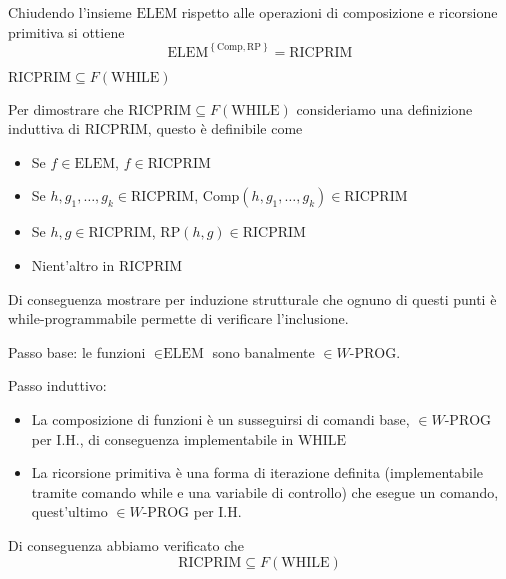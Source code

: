 \documentclass[12pt, answers]{exam}
\theoremstyle{plain}
\newcommand{\while}{\text{WHILE}}
\newcommand{\elem}{\text{ELEM}}
\newcommand{\wprog}{W\text{-PROG}}
\newcommand{\comp}{\text{Comp}}
\newcommand{\rp}{\text{RP}}
\newcommand{\ricprim}{\text{RICPRIM}}
\begin{document}
\begin{questions}
\begin{solution}
            Chiudendo l'insieme $\elem$ rispetto alle operazioni di composizione e ricorsione primitiva si ottiene
            $$ \elem^{\left\{\comp, \rp\right\}} = \ricprim $$
        \end{solution}
        
        \question $\ricprim \subseteq F(\while)$
        
        \begin{solution}
            Per dimostrare che $\ricprim \subseteq F(\while)$ consideriamo una definizione induttiva di $\ricprim$, questo è definibile come
            \begin{itemize}
                \item Se $f \in \elem$, $f \in \ricprim$
                
                \item Se $h,g_1, \dots, g_k \in \ricprim$, $\comp(h, g_1, \dots, g_k) \in \ricprim$
                
                \item Se $h,g \in \ricprim$, $\rp (h,g) \in \ricprim$
                
                \item Nient'altro in $\ricprim$
            \end{itemize}
            
            Di conseguenza mostrare per induzione strutturale che ognuno di questi punti è while-programmabile permette di verificare l'inclusione.
            
            Passo base: le funzioni $\in \elem$ sono banalmente $\in \wprog$.
            
            Passo induttivo:
            \begin{itemize}
                \item La composizione di funzioni è un susseguirsi di comandi base, $\in \wprog$ per I.H., di conseguenza implementabile in $\while$
                
                \item La ricorsione primitiva è una forma di iterazione definita (implementabile tramite comando while e una variabile di controllo) che esegue un comando, quest'ultimo $\in \wprog$ per I.H.
            \end{itemize}
            
            Di conseguenza abbiamo verificato che
            $$ \ricprim \subseteq F(\while) $$
        \end{solution}
        

\end{questions}
\end{document}
